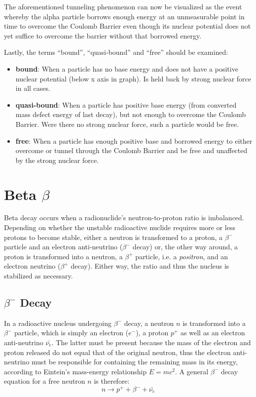 \pagebreak

The aforementioned tunneling phenomenon can now be visualized as the event whereby the alpha particle borrows enough energy at an unmeasurable point in time to overcome the Coulomb Barrier even though its nuclear potential does not yet suffice to overcome the barrier without that borrowed energy.

Lastly, the terms ``bound'', ``quasi-bound'' and ``free'' should be examined:

\begin{itemize}
  \item \textbf{bound}: When a particle has no base energy and does not have a positive nuclear potential (below x axis in graph). Is held back by strong nuclear force in all cases.

  \item \textbf{quasi-bound}: When a particle has positive base energy (from converted mass defect energy of last decay), but not enough to overcome the Coulomb Barrier. Were there no strong nuclear force, such a particle would be free.

  \item \textbf{free}: When a particle has enough positive base and borrowed energy to either overcome or tunnel through the Coulomb Barrier and be free and unaffected by the strong nuclear force.
\end{itemize}

\section*{Beta $\beta$}

Beta decay occurs when a radionuclide's neutron-to-proton ratio is imbalanced. Depending on whether the unstable radioactive nuclide requires more or less protons to become stable, either a neutron is transformed to a proton, a $\beta^-$ particle and an electron anti-neutrino ($\beta^-$ decay) or, the other way around, a proton is transformed into a neutron, a $\beta^+$ particle, i.e. a \emph{positron}, and an electron neutrino ($\beta^+$ decay). Either way, the ratio and thus the nucleus is stabilized as necessary.

\subsection*{$\beta^-$ Decay}

In a radioactive nucleus undergoing $\beta^-$ decay, a neutron $n$ is transformed into a $\beta^-$ particle, which is simply an electron ($e^-$), a proton $p^+$ as well as an electron anti-neutrino $\bar{\nu_{e}}$. The latter must be present because the mass of the electron and proton released do not equal that of the original neutron, thus the electron anti-neutrino must be responsible for containing the remaining mass in its energy, according to Eintein's mass-energy relationship $E = mc^2$. A general $\beta^-$ decay equation for a free neutron $n$ is therefore: $$n \rightarrow p^+ + \beta^- + \bar{\nu_{e}}$$

